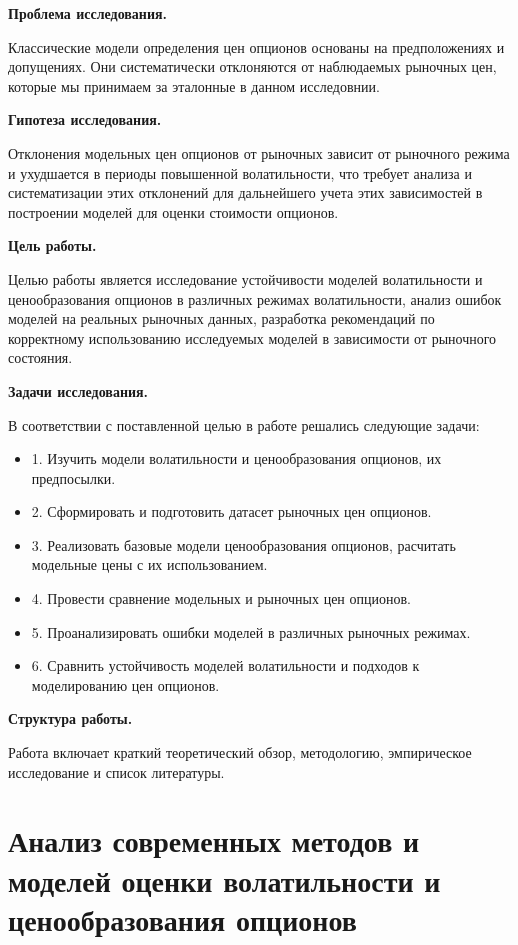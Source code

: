 \documentclass[11pt,a4paper]{article}
\begin{document}
\textbf{Проблема исследования.}

Классические модели определения цен опционов основаны на предположениях и допущениях. Они систематически отклоняются от наблюдаемых рыночных цен, которые мы принимаем за эталонные в данном исследовнии. 

\textbf{Гипотеза исследования.}

Отклонения модельных цен опционов от рыночных зависит от рыночного режима и ухудшается в периоды повышенной волатильности, что требует анализа и систематизации этих отклонений для дальнейшего учета этих зависимостей в построении моделей для оценки стоимости опционов. 

\textbf{Цель работы.}

Целью работы является исследование устойчивости моделей волатильности и ценообразования опционов в различных режимах волатильности, анализ ошибок моделей на реальных рыночных данных, разработка рекомендаций по корректному использованию исследуемых моделей в зависимости от рыночного состояния. 

\textbf{Задачи исследования.}

В соответствии с поставленной целью в работе решались следующие задачи:

\begin{itemize}

    \item 1. Изучить модели волатильности и ценообразования опционов, их предпосылки.
    \item 2. Сформировать и подготовить датасет рыночных цен опционов.
    \item 3. Реализовать базовые модели ценообразования опционов, расчитать модельные цены с их использованием. 
    \item 4. Провести сравнение модельных и рыночных цен опционов.
    \item 5. Проанализировать ошибки моделей в различных рыночных режимах.
    \item 6. Сравнить устойчивость моделей волатильности и подходов к моделированию цен опционов.

\end{itemize}

\textbf{Структура работы.}

Работа включает краткий теоретический обзор, методологию, эмпирическое исследование и список литературы.

\section{Анализ современных методов и моделей оценки волатильности и ценообразования опционов}
\end{document}
